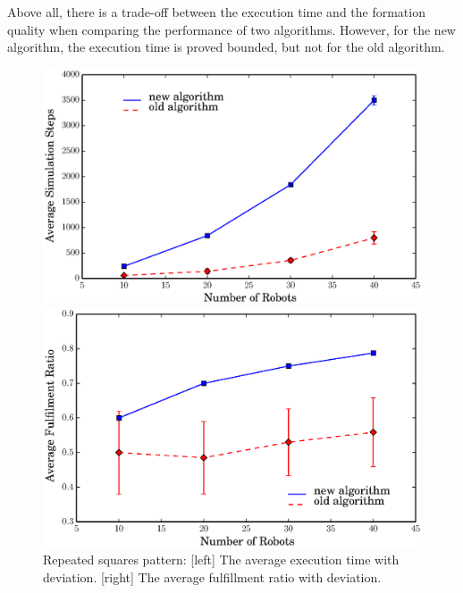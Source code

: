  Above all, there is a trade-off between the execution time and the
  formation quality when comparing the performance of two algorithms.
  However, for the new algorithm, the execution time is proved bounded,
  but not for the old algorithm.


  
  \begin{figure}
    \centering    
    \begin{minipage}[b]{0.75\linewidth}
    \centering  
      \includegraphics[trim=0.5cm 0cm 1.5cm 0,clip=true,width=\linewidth]{figs/steps_square}
    \end{minipage}
    \begin{minipage}[b]{0.75\linewidth}
    \centering 
      \includegraphics[trim=0.5cm 0 1.5cm 0,clip=true,width=\linewidth]{figs/ratio_square}
    \end{minipage}
    \caption{Repeated squares pattern: [left] The average execution time with deviation. [right] The average fulfillment ratio with deviation.}
    \label{fig:sq_comp}
  \end{figure}
